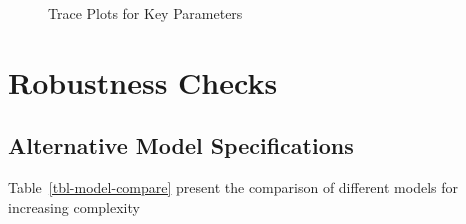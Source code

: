 \documentclass[
  letterpaper,
  DIV=11,
  numbers=noendperiod]{scrartcl}
\begin{document}
\begin{figure}[H]


\caption{\label{fig-trace}Trace Plots for Key Parameters}

\end{figure}%

\section{Robustness Checks}\label{sec-appC}

\subsection{Alternative Model
Specifications}\label{alternative-model-specifications}

Table~\ref{tbl-model-compare} present the comparison of different models
for increasing complexity
\end{document}
